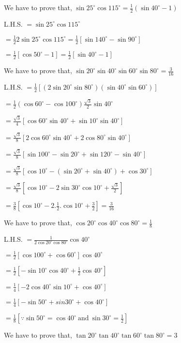 \item We have to prove that, $\sin 25^\circ\cos 115^\circ = \frac{1}{2}(\sin 40^\circ - 1)$

  L.H.S. $= \sin 25^\circ\cos 115^\circ$

  $= \frac{1}{2}2\sin25^\circ\cos115^\circ = \frac{1}{2}[\sin140^\circ - \sin90^\circ]$

  $= \frac{1}{2}[\cos50^\circ - 1] = \frac{1}{2}[\sin40^\circ - 1]$

\item We have to prove that, $\sin 20^\circ \sin 40^\circ\sin 60^\circ \sin80^\circ = \frac{3}{16}$

  L.H.S. $= \frac{1}{2}[(2\sin 20^\circ\sin80^\circ)(\sin40^\circ\sin60^\circ)]$

  $= \frac{1}{2}(\cos60^\circ - \cos100^\circ)\frac{\sqrt{3}}{2}\sin40^\circ$

  $= \frac{\sqrt{3}}{4}[\cos60^\circ\sin40^\circ + \sin10^\circ\sin40^\circ]$

  $= \frac{\sqrt{3}}{8}[2\cos60^\circ\sin40^\circ + 2\cos80^\circ\sin40^\circ]$

  $= \frac{\sqrt{3}}{8}[\sin100^\circ - \sin 20^\circ + \sin 120^\circ - \sin 40^\circ]$

  $= \frac{\sqrt{3}}{8}[\cos10^\circ - (\sin20^\circ + \sin40^\circ) + \cos30^\circ]$

  $= \frac{\sqrt{3}}{8}[\cos10^\circ - 2\sin30^\circ\cos10^\circ + \frac{\sqrt{3}}{2}]$

  $= \frac{3}{8}[\cos10^\circ - 2.\frac{1}{2}.\cos10^\circ + \frac{3}{2}] = \frac{3}{16}$

\item We have to prove that, $\cos 20^\circ\cos40^\circ\cos80^\circ = \frac{1}{8}$

  L.H.S. $= \frac{1}{2\cos20^\circ\cos80^\circ}\cos40^\circ$

  $= \frac{1}{2}[\cos100^\circ + \cos60^\circ]\cos40^\circ$

  $= \frac{1}{2}[-\sin10^\circ\cos40^\circ + \frac{1}{2}\cos40^\circ]$

  $= \frac{1}{4}[-2\cos40^\circ\sin10^\circ + \cos40^\circ]$

  $= \frac{1}{4}[-\sin50^\circ + sin30^\circ + \cos40^\circ]$

  $= \frac{1}{8}[\because \sin50^\circ = \cos40^\circ~\text{and}~\sin30^\circ = \frac{1}{2}]$

\item We have to prove that, $\tan20^\circ\tan40^\circ\tan60^\circ\tan80^\circ = 3$

